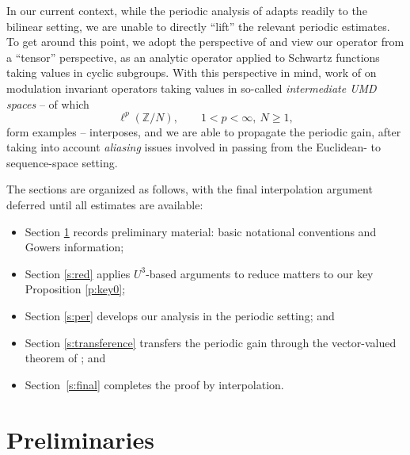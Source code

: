\documentclass[12pt,leqno]{amsart}
\numberwithin{equation}{section}
\theoremstyle{definition}
\theoremstyle{plain}
\begin{document}
	In our current context, while the periodic analysis of \cite{FKMS26} adapts readily to the bilinear setting, we are unable to directly ``lift'' the relevant periodic estimates. To get around this point, we adopt the perspective of \cite{KMT} and view our operator from a ``tensor'' perspective, as an analytic operator applied to Schwartz functions taking values in cyclic subgroups. With this perspective in mind, work of \cite{DPLMV} on modulation invariant operators taking values in so-called \emph{intermediate UMD spaces} -- of which 
	\[ \ell^p(\mathbb{Z}/N), \qquad  1 < p < \infty, \ N \geq 1, \]
	form examples -- interposes, and we are able to propagate the periodic gain, after taking into account \emph{aliasing} issues involved in passing from the Euclidean- to sequence-space setting.
	
	\medskip
	
	The sections are organized as follows, with the final interpolation argument deferred until all estimates are available:
	\begin{itemize}
		\item Section \ref{s:Prelim} records preliminary material: basic notational conventions and Gowers information;
		\item Section \ref{s:red} applies $U^3$-based arguments to reduce matters to our key Proposition \ref{p:key0};
		\item Section \ref{s:per} develops our analysis in the periodic setting; and
		\item Section \ref{s:transference} transfers the periodic gain through the vector-valued theorem of \cite{DPLMV}; and
		\item Section~\ref{s:final} completes the proof by interpolation.
	\end{itemize}
	
	
	\section{Preliminaries}\label{s:Prelim}
	
\end{document}
